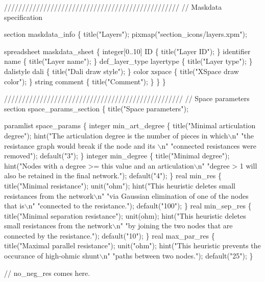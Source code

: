 /////////////////////////////////////////////////
// Maskdata specification

section maskdata_info \{
    title("Layers");
    pixmap("section_icons/layers.xpm");

    spreadsheet maskdata_sheet \{
        integer[0..10]     ID \{ title("Layer ID"); \}
        identifier          name \{ title("Layer name"); \}
        def_layer_type      layertype \{ title("Layer type"); \}
        dalistyle           dali \{ title("Dali draw style"); \}
        color               xspace \{ title("XSpace draw color"); \}
        string              comment \{ title("Comment"); \}
    \}
\}

//////////////////////////////////////////////////
// Space parameters
section space_params_section \{
    title("Space parameters");

    paramlist space_params \{
        integer min_art_degree \{
            title("Minimal articulation degree");
            hint("The articulation degree is the number of pieces in which\(\backslash\)n"
                  "the resistance graph would break if the node and its \(\backslash\)n"
                  "connected resistances were removed");
            default("3");
        \}
        integer min_degree \{
            title("Minimal degree");
            hint("Nodes with a degree >= this value and an articulation\(\backslash\)n"
                 "degree > 1 will also be retained in the final network.");
            default("4");
        \}
        real min_res \{
            title("Minimal resistance");
            unit("ohm");
            hint("This heuristic deletes small resistances from the network\(\backslash\)n"
                  "via Gaussian elimination of one of the nodes that is\(\backslash\)n"
                  "connected to the resistance.");
            default("100");
        \}
        real min_sep_res \{
            title("Minimal separation resistance");
            unit(ohm);
            hint("This heuristic deletes small resistances from the network\(\backslash\)n"
                 "by joining the two nodes that are connected by the resistance.");
            default("10");
        \}
        real max_par_res \{
            title("Maximal parallel resistance");
            unit("ohm");
            hint("This heuristic prevents the occurance of high-ohmic shunt\(\backslash\)n"
                 "paths between two nodes.");
            default("25");
        \}

        // no_neg_res comes here.

